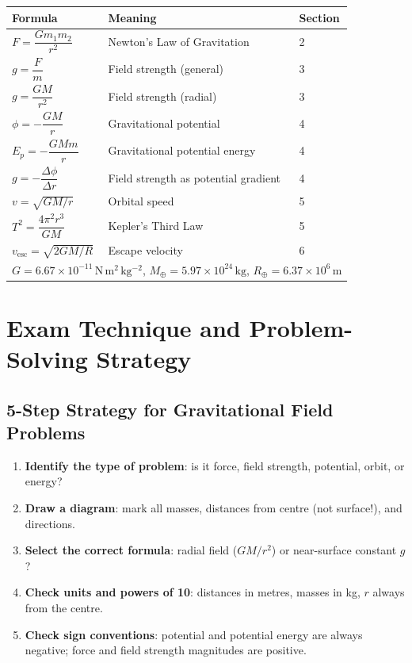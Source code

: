 \begin{summarybox}
\renewcommand{\arraystretch}{1.7}
\begin{tabular}{p{5.5cm} p{5.5cm} p{2cm}}
\toprule
\textbf{Formula} & \textbf{Meaning} & \textbf{Section} \\
\midrule
$F = \dfrac{Gm_1m_2}{r^2}$
  & Newton's Law of Gravitation & 2 \\[6pt]
$g = \dfrac{F}{m}$
  & Field strength (general) & 3 \\[6pt]
$g = \dfrac{GM}{r^2}$
  & Field strength (radial) & 3 \\[6pt]
$\phi = -\dfrac{GM}{r}$
  & Gravitational potential & 4 \\[6pt]
$E_p = -\dfrac{GMm}{r}$
  & Gravitational potential energy & 4 \\[6pt]
$g = -\dfrac{\Delta\phi}{\Delta r}$
  & Field strength as potential gradient & 4 \\[6pt]
$v = \sqrt{GM/r}$
  & Orbital speed & 5 \\[6pt]
$T^2 = \dfrac{4\pi^2 r^3}{GM}$
  & Kepler's Third Law & 5 \\[6pt]
$v_{\text{esc}} = \sqrt{2GM/R}$
  & Escape velocity & 6 \\
\midrule
\multicolumn{3}{l}{\small $G = 6.67\times10^{-11}\,\mathrm{N\,m^2\,kg^{-2}}$,\quad
  $M_{\oplus} = 5.97\times10^{24}\,\mathrm{kg}$,\quad
  $R_{\oplus} = 6.37\times10^{6}\,\mathrm{m}$} \\
\bottomrule
\end{tabular}
\end{summarybox}

\section{Exam Technique and Problem-Solving Strategy}

\subsection{5-Step Strategy for Gravitational Field Problems}
\begin{enumerate}
  \item \textbf{Identify the type of problem}: is it force, field strength, potential,
        orbit, or energy?
  \item \textbf{Draw a diagram}: mark all masses, distances from centre (not surface!),
        and directions.
  \item \textbf{Select the correct formula}: radial field ($GM/r^2$) or near-surface
        constant $g$?
  \item \textbf{Check units and powers of 10}: distances in metres, masses in kg,
        $r$ always from the centre.
  \item \textbf{Check sign conventions}: potential and potential energy are always
        negative; force and field strength magnitudes are positive.
\end{enumerate}

